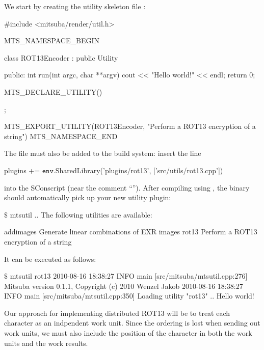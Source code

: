 We start by creating the utility skeleton file :
\begin{cpp}
#include <mitsuba/render/util.h>

MTS_NAMESPACE_BEGIN

class ROT13Encoder : public Utility {
public:
	int run(int argc, char **argv) {
		cout << "Hello world!" << endl;
		return 0;
	}

	MTS_DECLARE_UTILITY()
};

MTS_EXPORT_UTILITY(ROT13Encoder, "Perform a ROT13 encryption of a string")
MTS_NAMESPACE_END
\end{cpp}
The file must also be added to the build system: insert the line
\begin{shell}
plugins += $\texttt{env}$.SharedLibrary('plugins/rot13', ['src/utils/rot13.cpp'])
\end{shell}
into the SConscript (near the comment ``''). After compiling
using , the  binary should automatically pick up your new utility plugin:
\begin{shell}
$\texttt{\$}$ mtsutil
..
The following utilities are available:

	addimages             Generate linear combinations of EXR images
	rot13                 Perform a ROT13 encryption of a string
\end{shell}
It can be executed as follows:
\begin{shell}
$\texttt{\$}$ mtsutil rot13
2010-08-16 18:38:27 INFO  main [src/mitsuba/mtsutil.cpp:276] Mitsuba version 0.1.1, Copyright (c) 2010 Wenzel Jakob
2010-08-16 18:38:27 INFO  main [src/mitsuba/mtsutil.cpp:350] Loading utility "rot13" ..
Hello world!
\end{shell}

Our approach for implementing distributed ROT13 will be to treat each character as an 
indpendent work unit. Since the ordering is lost when sending out work units, we must
also include the position of the character in both the work units and the work results.

